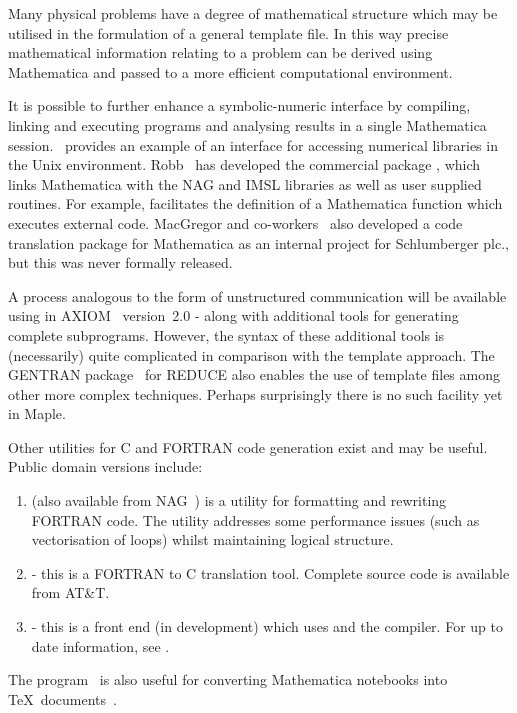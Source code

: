 \documentclass [12pt,twoside]{article}
\begin{document}
Many physical problems have a degree of mathematical structure
which may be utilised in the formulation of a general template file. In this way
precise mathematical information relating to a problem can be derived using
Mathematica and passed to a more efficient computational environment.

It is possible to further enhance a symbolic-numeric interface by
compiling, linking and executing programs and analysing results in a
single Mathematica session. \cite{khera}~provides an
example of an interface for accessing numerical libraries in the Unix
environment. Robb~\cite{broughan-91} has developed the commercial package
, which links Mathematica with the NAG and IMSL libraries as
well as user supplied routines. For example,  facilitates
the definition of a Mathematica function which executes external code.
MacGregor and co-workers~\cite{macgregor} also developed a code translation
package for Mathematica as an internal project for Schlumberger plc., but this
was never formally released.

A process analogous to the  form of unstructured
communication will be available using  in AXIOM~\cite{axiom}
version~2.0 - along with additional tools for generating complete
subprograms. However, the syntax of these additional tools is
(necessarily) quite complicated in comparison with the template
approach. The GENTRAN package~\cite{gates-87} for REDUCE also enables
the use of template files among other more complex techniques. Perhaps
surprisingly there is no such facility yet in Maple.

Other utilities for C and FORTRAN code generation exist and may be
useful. Public domain versions include:
\begin{enumerate}
\item {} (also available from NAG~\cite{nag}) is a utility for
formatting and rewriting FORTRAN code. The utility addresses some
performance issues (such as vectorisation of loops) whilst maintaining
logical structure.

\item {} - this is a FORTRAN to C translation tool. Complete source code
is available from AT\&T.

\item {} - this is a front end (in development) which uses 
and the  compiler. For up to date information, see \cite{fort-info}.
\end{enumerate}
The program~ is also useful for converting Mathematica notebooks
into \TeX\ documents~\cite{mathsource}.
\end{document}
